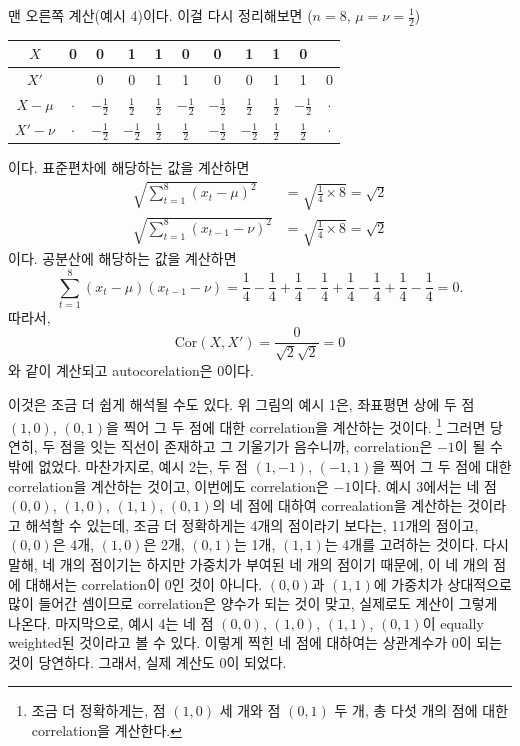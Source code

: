\documentclass{article}
\begin{document}
맨 오른쪽 계산(예시 4)이다.
이걸 다시 정리해보면 (\(n=8\), \(\mu=\nu=\frac12\))
\begin{center}
\begin{tabular}{c|cccccccccc}
$X $&0&0&1&1&0&0&1&1&0&\\\hline
$X'$& &0&0&1&1&0&0&1&1&0\\\hline
$X-\mu$&$\cdot$&$-\frac12$&$\frac12$&$\frac12$&$-\frac12$&$-\frac12$&$\frac12$&$\frac12$&$-\frac12$&$\cdot$\\\hline
$X'-\nu$&$\cdot$&$-\frac12$&$-\frac12$&$\frac12$&$\frac12$&$-\frac12$&$-\frac12$&$\frac12$&$\frac12$&$\cdot$
\end{tabular}
\end{center}
이다.
표준편차에 해당하는 값을 계산하면
\begin{align*}
\sqrt{\sum_{t=1}^8(x_t-\mu)^2}
&=\sqrt{\frac14\times8}=\sqrt 2\\
\sqrt{\sum_{t=1}^8(x_{t-1}-\nu)^2}
&=\sqrt{\frac14\times8}=\sqrt 2
\end{align*}
이다. 공분산에 해당하는 값을 계산하면
\[\sum_{t=1}^8(x_t-\mu)(x_{t-1}-\nu)=\frac14-\frac14+\frac14-\frac14+\frac14-\frac14+\frac14-\frac14=0.\]
따라서,
\[\text{Cor}(X,X')=\frac{0}{\sqrt2\sqrt2}=0\]
와 같이 계산되고 autocorelation은 0이다.

이것은 조금 더 쉽게 해석될 수도 있다.
위 그림의 예시 1은, 좌표평면 상에 두 점 \((1,0)\), \((0,1)\)을 찍어 그 두 점에 대한 correlation을 계산하는 것이다.
\footnote{조금 더 정확하게는, 점 \((1,0)\) 세 개와 점 \((0,1)\) 두 개, 총 다섯 개의 점에 대한 correlation을 계산한다.}
그러면 당연히, 두 점을 잇는 직선이 존재하고 그 기울기가 음수니까, correlation은 \(-1\)이 될 수밖에 없었다.
마찬가지로, 예시 2는, 두 점 \((1,-1)\), \((-1,1)\)을 찍어 그 두 점에 대한 correlation을 계산하는 것이고, 이번에도 correlation은 \(-1\)이다.
예시 3에서는 네 점 \((0,0)\), \((1,0)\), \((1,1)\), \((0,1)\)의 네 점에 대하여 correalation을 계산하는 것이라고 해석할 수 있는데,
조금 더 정확하게는 4개의 점이라기 보다는, 11개의 점이고, \((0,0)\)은 4개, \((1,0)\)은 2개, \((0,1)\)는 1개, \((1,1)\)는 4개를 고려하는 것이다.
다시 말해, 네 개의 점이기는 하지만 가중치가 부여된 네 개의 점이기 때문에, 이 네 개의 점에 대해서는 correlation이 0인 것이 아니다.
\((0,0)\)과 \((1,1)\)에 가중치가 상대적으로 많이 들어간 셈이므로 correlation은 양수가 되는 것이 맞고, 실제로도 계산이 그렇게 나온다.
마지막으로, 예시 4는 네 점 \((0,0)\), \((1,0)\), \((1,1)\), \((0,1)\)이 equally weighted된 것이라고 볼 수 있다.
이렇게 찍힌 네 점에 대하여는 상관계수가 0이 되는 것이 당연하다.
그래서, 실제 계산도 0이 되었다.
\end{document}
